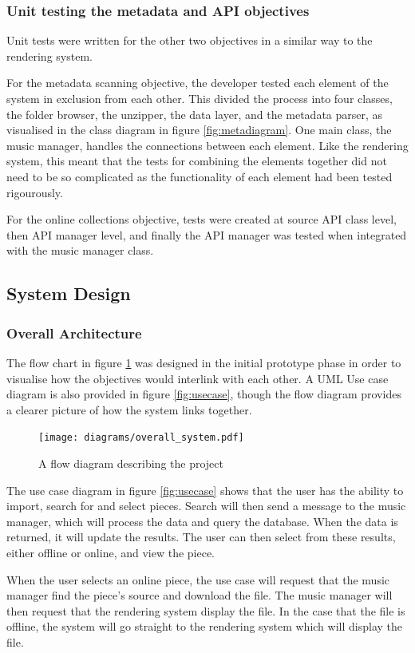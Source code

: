 \subsubsection{Unit testing the metadata and API objectives}
Unit tests were written for the other two objectives in a similar way to the rendering system.

For the metadata scanning objective, the developer tested each element of the system in exclusion from each other. This divided the process into four classes, the folder browser, the unzipper, the data layer, and the metadata parser, as visualised in the class diagram in figure \ref{fig:metadiagram}. One main class, the music manager, handles the connections between each element. Like the rendering system, this meant that the tests for combining the elements together did not need to be so complicated as the functionality of each element had been tested rigourously.

For the online collections objective, tests were created at source API class level, then API manager level, and finally the API manager was tested when integrated with the music manager class.

\subsection{System Design}
\subsubsection{Overall Architecture}
The flow chart in figure \ref{fig:flowchart} was designed in the initial prototype phase in order to visualise how the objectives would interlink with each other. A UML Use case diagram is also provided in figure \ref{fig:usecase}, though the flow diagram provides a clearer picture of how the system links together.
\begin{figure}[h]
    \centering
    \texttt{[image: diagrams/overall\_system.pdf]}
    \caption{A flow diagram describing the project}
    \label{fig:flowchart}
\end{figure}
The use case diagram in figure \ref{fig:usecase} shows that the user has the ability to import, search for and select pieces. Search will then send a message to the music manager, which will process the data and query the database. When the data is returned, it will update the results. The user can then select from these results, either offline or online, and view the piece. 

When the user selects an online piece, the use case will request that the music manager find the piece's source and download the file. The music manager will then request that the rendering system display the file. In the case that the file is offline, the system will go straight to the rendering system which will display the file.

